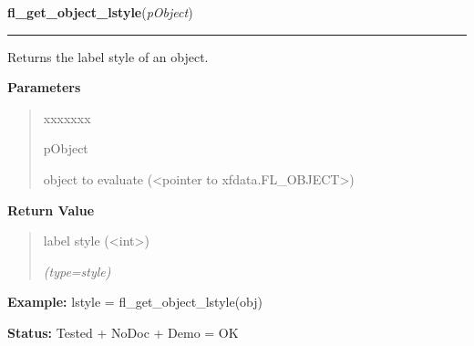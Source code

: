     \vspace{0.5ex}

\hspace{.8\funcindent}\begin{boxedminipage}{\funcwidth}

    \raggedright \textbf{fl\_get\_object\_lstyle}(\textit{pObject})

    \vspace{-1.5ex}

    \rule{\textwidth}{0.5\fboxrule}
\setlength{\parskip}{2ex}
    Returns the label style of an object.

\setlength{\parskip}{1ex}
      \textbf{Parameters}
      \vspace{-1ex}

      \begin{quote}
        \begin{Ventry}{xxxxxxx}

          \item[pObject]

          object to evaluate ({\textless}pointer to 
          xfdata.FL\_OBJECT{\textgreater})

        \end{Ventry}

      \end{quote}

      \textbf{Return Value}
    \vspace{-1ex}

      \begin{quote}
      label style ({\textless}int{\textgreater})

      {\it (type=style)}

      \end{quote}

\textbf{Example:} lstyle = fl\_get\_object\_lstyle(obj)



\textbf{Status:} Tested + NoDoc + Demo = OK



    \end{boxedminipage}

    \label{xformslib:library:fl_set_object_lcol}

    \vspace{0.5ex}

